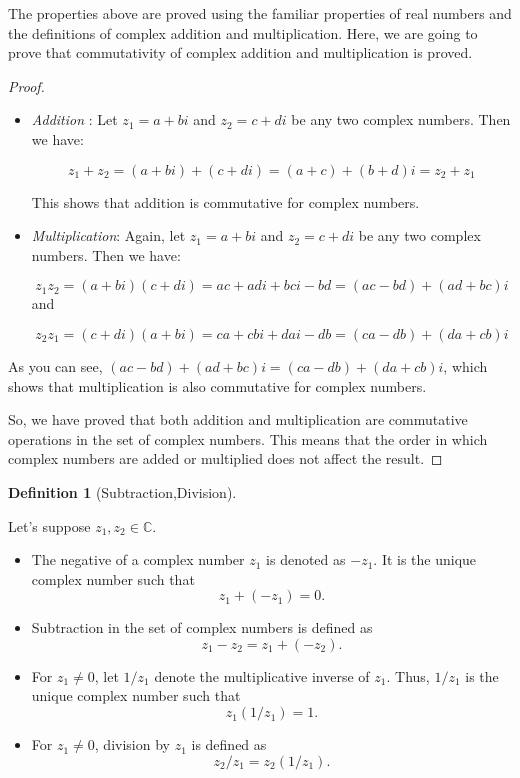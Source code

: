 \documentclass[
]{book}
\providecommand{\tightlist}{%
  \setlength{\itemsep}{0pt}\setlength{\parskip}{0pt}}
\theoremstyle{definition}
\newtheorem{definition}{Definition}[chapter]
\theoremstyle{definition}
\theoremstyle{definition}
\theoremstyle{definition}
\theoremstyle{remark}
\begin{document}
The properties above are proved using the familiar properties of real numbers and the definitions of complex addition and multiplication. Here, we are going to prove that commutativity of complex addition and multiplication is proved.

\begin{proof}
\leavevmode

\begin{itemize}
\item
  \emph{Addition} : Let \(z_1 = a + bi\) and \(z_2 = c + di\) be any two complex numbers. Then we have:

  \[z_1 + z_2 = (a + bi) + (c + di) = (a + c) + (b + d)i = z_2 + z_1\]

  This shows that addition is commutative for complex numbers.
\item
  \emph{Multiplication}: Again, let \(z_1 = a + bi\) and \(z_2 = c + di\) be any two complex numbers. Then we have:

  \[z_1z_2 = (a + bi)(c + di) = ac + adi + bci - bd = (ac - bd) + (ad + bc)i\]
  and

  \[z_2z_1 = (c + di)(a + bi) = ca + cbi + dai - db = (ca - db) + (da + cb)i\]
\end{itemize}

As you can see, \((ac - bd) + (ad + bc)i = (ca - db) + (da + cb)i\), which shows that multiplication is also commutative for complex numbers.

So, we have proved that both addition and multiplication are commutative operations in the set of complex numbers. This means that the order in which complex numbers are added or multiplied does not affect the result.

\end{proof}

\begin{definition}[Subtraction,Division]
\protect\hypertarget{def:unnamed-chunk-5}{}\label{def:unnamed-chunk-5}

Let's suppose \(z_1, z_2 \in \mathbb{C}\).

\begin{itemize}
\tightlist
\item
  The negative of a complex number \(z_1\) is denoted as \(-z_1\). It is the unique complex number such that \[z_1 + (-z_1) = 0.\]
\item
  Subtraction in the set of complex numbers is defined as \[z_1 - z_2 = z_1 + (-z_2).\]
\item
  For \(z_1 \neq 0\), let \(1/z_1\) denote the multiplicative inverse of \(z_1\). Thus, \(1/z_1\) is the unique complex number such that \[z_1(1/z_1) = 1.\]
\item
  For \(z_1 \neq 0\), division by \(z_1\) is defined as \[z_2/z_1 = z_2(1/z_1).\]
\end{itemize}

\end{definition}
\end{document}

